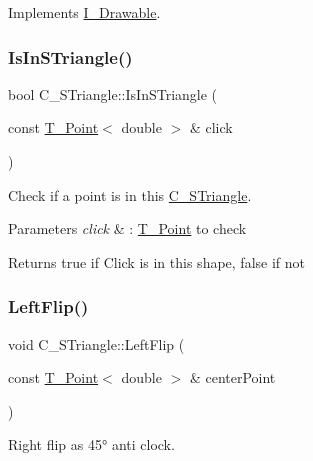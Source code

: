 Implements \hyperlink{classI__Drawable_a25f6474325614c451a91f019e5fe8010}{I\+\_\+\+Drawable}.

\mbox{\label{classC__STriangle_ae0cfadc631baf280df7e77f011489caa}} 
\subsubsection{\texorpdfstring{Is\+In\+S\+Triangle()}{IsInSTriangle()}}
{\footnotesize\ttfamily bool C\+\_\+\+S\+Triangle\+::\+Is\+In\+S\+Triangle (\begin{DoxyParamCaption}\item[{const \hyperlink{classT__Point}{T\+\_\+\+Point}$<$ double $>$ \&}]{click }\end{DoxyParamCaption})}



Check if a point is in this \hyperlink{classC__STriangle}{C\+\_\+\+S\+Triangle}. 


\begin{DoxyParams}{Parameters}
{\em click} & \+: \hyperlink{classT__Point}{T\+\_\+\+Point} to check \\
\hline
\end{DoxyParams}
\begin{DoxyReturn}{Returns}
true if Click is in this shape, false if not 
\end{DoxyReturn}
\mbox{\label{classC__STriangle_aec7540d5750509269894dc4c906fc20f}} 
\subsubsection{\texorpdfstring{Left\+Flip()}{LeftFlip()}}
{\footnotesize\ttfamily void C\+\_\+\+S\+Triangle\+::\+Left\+Flip (\begin{DoxyParamCaption}\item[{const \hyperlink{classT__Point}{T\+\_\+\+Point}$<$ double $>$ \&}]{center\+Point }\end{DoxyParamCaption})}



Right flip as 45° anti clock. 


